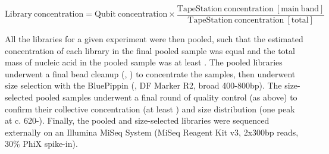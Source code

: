 \begin{equation}
\mathrm{Library~concentration} = \mathrm{Qubit~concentration} \times \frac{\mathrm{TapeStation~concentration~[main~band]}}{\mathrm{TapeStation~concentration~[total]}}
\label{eq:library-conc}
\end{equation}

All the libraries for a given experiment were then pooled, such that the estimated concentration of each library in the final pooled sample was equal and the total mass of nucleic acid in the pooled sample was at least . The pooled libraries underwent a final bead cleanup (, ) to concentrate the samples, then underwent size selection with the BluePippin (,  DF Marker R2, broad 400-800bp). The size-selected pooled samples underwent a final round of quality control (as above) to confirm their collective concentration (at least ) and size distribution (one peak at c. 620-). Finally, the pooled and size-selected libraries were sequenced externally on an Illumina MiSeq System (MiSeq Reagent Kit v3, 2x300bp reads, 30\% PhiX spike-in). %
